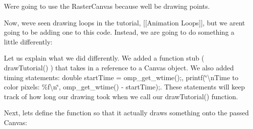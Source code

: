 We\textquotesingle{}re going to use the Raster\+Canvas because we\textquotesingle{}ll be drawing points.

Now, we\textquotesingle{}ve seen drawing loops in the tutorial, \mbox{[}\mbox{[}Animation Loops\mbox{]}\mbox{]}, but we aren\textquotesingle{}t going to be adding one to this code. Instead, we are going to do something a little differently\+:


\begin{DoxyCode}{0}
\DoxyCodeLine{\textcolor{preprocessor}{\#include <tsgl.h>}}
\DoxyCodeLine{}
\DoxyCodeLine{}
\DoxyCodeLine{\}}
\DoxyCodeLine{}
\DoxyCodeLine{}
\DoxyCodeLine{}
\DoxyCodeLine{\}}
\end{DoxyCode}


Let us explain what we did differently. We added a function stub ( {\ttfamily draw\+Tutorial()} ) that takes in a reference to a Canvas object. We also added timing statements\+: {\ttfamily double start\+Time = omp\+\_\+get\+\_\+wtime();}, {\ttfamily printf(\char`\"{}\textbackslash{}n\+Time to color pixels\+: \%f\textbackslash{}n\char`\"{}, omp\+\_\+get\+\_\+wtime() -\/ start\+Time);}. These statements will keep track of how long our drawing took when we call our {\ttfamily draw\+Tutorial()} function.

Next, let\textquotesingle{}s define the function so that it actually draws something onto the passed Canvas\+:


